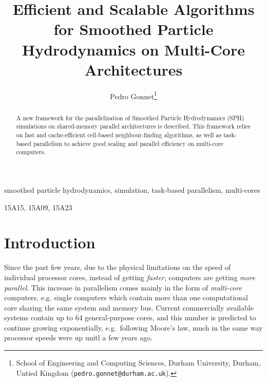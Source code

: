 \documentclass[final]{siamltex}
\date{}
\title{Efficient and Scalable Algorithms for Smoothed Particle Hydrodynamics on Multi-Core
    Architectures}
\author{Pedro Gonnet\thanks{School of Engineering and Computing Sciences,
    Durham University, Durham, Untied Kingdom ({\tt pedro.gonnet@durham.ac.uk}).}}
\begin{document}
\lstset{%
    language=C,
    basicstyle=\small\tt,
    numbers=left,
    numberstyle=\tiny
    }


\maketitle


\begin{abstract}
A new framework for the parallelization of Smoothed Particle Hydrodynamics (SPH)
simulations on shared-memory parallel architectures is described.
This framework relies on fast and cache-efficient cell-based neighbour-finding
algorithms, as well as task-based parallelism to achieve good scaling and
parallel efficiency on multi-core computers.
\end{abstract}


\begin{keywords} 
smoothed particle hydrodynamics,
simulation,
task-based parallelism,
multi-cores
\end{keywords}

\begin{AMS}
15A15, 15A09, 15A23
\end{AMS}

\pagestyle{myheadings}
\thispagestyle{plain}


\section{Introduction}

Since the past few years, due to the physical limitations
on the speed of individual processor cores, instead of
getting {\em faster}, computers are getting {\em more parallel}.
This increase in parallelism comes mainly in the form of
{\em multi-core} computers, e.g. single computers which
contain more than one computational core sharing the 
same system and memory bus.
Current commercially available systems contain up to 64
general-purpose cores, and this number is predicted to continue
growing exponentially, e.g.~following Moore's law, much in the
same way processor speeds were up unitl a few years ago.
\end{document}
